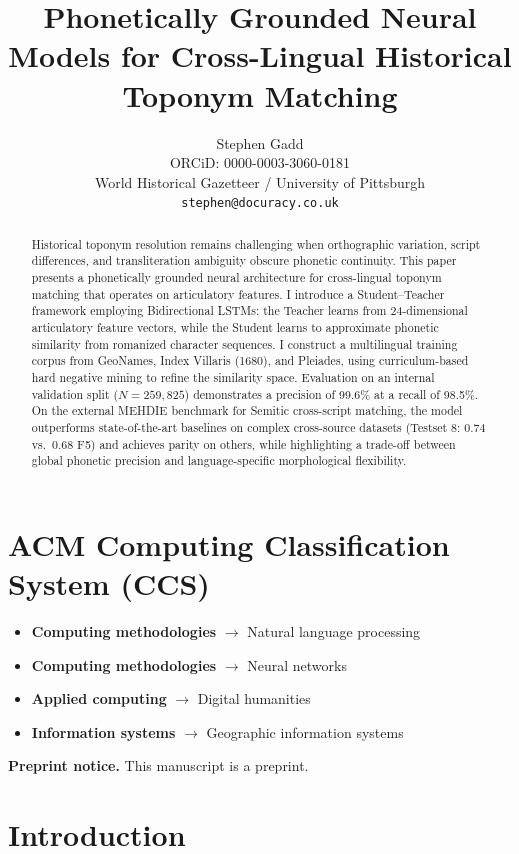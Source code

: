 \documentclass[11pt]{article}
\title{Phonetically Grounded Neural Models for Cross-Lingual Historical Toponym Matching}
\author{
    Stephen Gadd \\
    {\small ORCiD: 0000-0003-3060-0181} \\
    World Historical Gazetteer / University of Pittsburgh \\
    \texttt{stephen@docuracy.co.uk}
}
\date{}
\begin{document}
    \maketitle


    \section*{ACM Computing Classification System (CCS)}

    \begin{itemize}
        \item \textbf{Computing methodologies} $\rightarrow$ Natural language processing
        \item \textbf{Computing methodologies} $\rightarrow$ Neural networks
        \item \textbf{Applied computing} $\rightarrow$ Digital humanities
        \item \textbf{Information systems} $\rightarrow$ Geographic information systems
    \end{itemize}

    \begin{abstract}
        Historical toponym resolution remains challenging when orthographic variation, script differences, and transliteration ambiguity obscure phonetic continuity. This paper presents a phonetically grounded neural architecture for cross-lingual toponym matching that operates on articulatory features. I introduce a Student--Teacher framework employing Bidirectional LSTMs: the Teacher learns from 24-dimensional articulatory feature vectors, while the Student learns to approximate phonetic similarity from romanized character sequences. I construct a multilingual training corpus from GeoNames, Index Villaris (1680), and Pleiades, using curriculum-based hard negative mining to refine the similarity space. Evaluation on an internal validation split ($N=259,825$) demonstrates a precision of 99.6\% at a recall of 98.5\%. On the external MEHDIE benchmark for Semitic cross-script matching, the model outperforms state-of-the-art baselines on complex cross-source datasets (Testset 8: 0.74 vs.\ 0.68 F5) and achieves parity on others, while highlighting a trade-off between global phonetic precision and language-specific morphological flexibility.
    \end{abstract}

    \noindent\textbf{Preprint notice.}
    This manuscript is a preprint.


    \section{Introduction}
\end{document}
